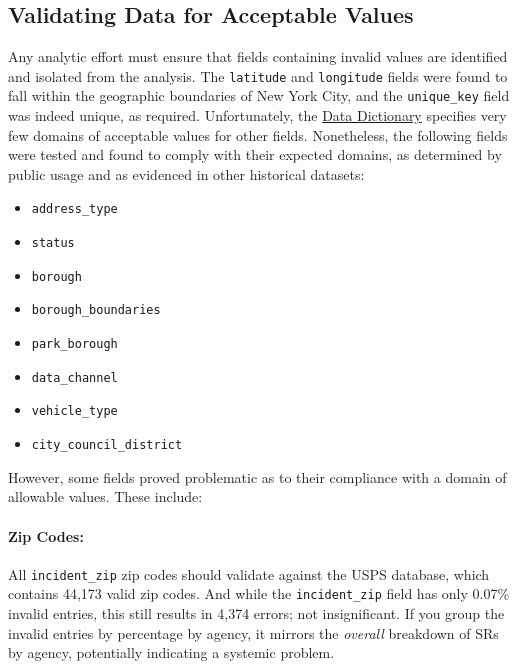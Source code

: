 \documentclass[linenumber]{jdsart}
\begin{document}
\subsection{Validating Data for Acceptable Values}
\label{sec:domain}
Any analytic effort must ensure that fields containing invalid values 
are identified and isolated from the analysis. The \texttt{latitude} 
and \texttt{longitude} fields were found to fall within the 
geographic boundaries of New York City, and 
the \texttt{unique\_key} field was indeed unique, as required. 
Unfortunately, the \href{https://data.cityofnewyork.us/api/views/erm2-nwe9/files/b372b884-f86a-453b-ba16-1fe06ce9d212?download=true&filename=311_ServiceRequest_2010-Present_DataDictionary_Updated_2023.xlsx}{Data Dictionary} specifies very few domains of 
acceptable values for other fields. Nonetheless, the following fields were tested and found to comply with their expected domains, as determined by public 
usage and as evidenced in other historical datasets:

\begin{itemize}[left=1.5em]
    \item \texttt{address\_type}
    \item \texttt{status}
    \item \texttt{borough}
    \item \texttt{borough\_boundaries}
    \item \texttt{park\_borough}
    \item \texttt{data\_channel}
    \item \texttt{vehicle\_type}
    \item \texttt{city\_council\_district}
\end{itemize}

However,  some fields proved problematic as to their 
compliance with a domain of allowable values. These include: 

\paragraph{Zip Codes:}
\label{sec:zipcodesissues}
All \texttt{incident\_zip} zip codes should 
validate against the USPS database, which contains 
44,173 valid zip codes. And while the \texttt{incident\_zip} field has 
only 0.07\% invalid entries, this still results in 4,374 errors; 
not insignificant. If you group the invalid entries by 
percentage by agency, it mirrors the \textit{overall} 
breakdown of SRs by agency, potentially 
indicating a systemic problem.
\end{document}
